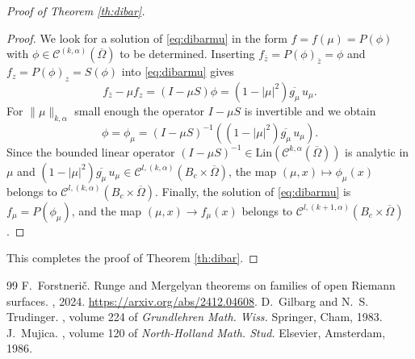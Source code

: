 \documentclass[10pt,a4paper]{amsart}
\newcommand\Cscr{\mathscr{C}}
\begin{document}
\begin{proof}[Proof of Theorem \ref{th:dibar}]
\begin{proof}
We look for a solution of \eqref{eq:dibarmu} in the form $f=f(\mu)=P(\phi)$ with 
$\phi\in \Cscr^{(k,\alpha)}(\overline\Omega)$ to be determined. 
Inserting $f_{\bar z}=P(\phi)_{\bar z}=\phi$ and $f_{z}=P(\phi)_z=S(\phi)$
into \eqref{eq:dibarmu} gives
\[
	f_{\bar z}-\mu f_z = (I-\mu S)\phi = 
	(1-|\mu|^2) \overline{g_\mu} \, u_\mu.
\]
For $\|\mu\|_{k,\alpha}$ small enough the operator $I-\mu S$ is
invertible and we obtain 
\[
	\phi=\phi_\mu = 
	(I-\mu S)^{-1}\left((1-|\mu|^2) \overline{g_\mu} \, u_\mu \right).
\] 
Since the bounded linear operator 
$(I-\mu S)^{-1}\in \mathrm{Lin}(\Cscr^{k,\alpha}(\overline \Omega))$
is analytic in $\mu$ and $(1-|\mu|^2) \overline{g_\mu} \, u_\mu 
\in \Cscr^{l,(k,\alpha)}(B_c\times\overline \Omega)$, the map
$(\mu,x)\mapsto \phi_\mu(x)$ belongs to
$\Cscr^{l,(k,\alpha)}(B_c\times\overline \Omega)$.
Finally, the solution of \eqref{eq:dibarmu} is $f_\mu = P(\phi_\mu)$,  
and the map $(\mu,x)\to f_\mu(x)$ belongs to
$\Cscr^{l,(k+1,\alpha)}(B_c\times \overline \Omega)$. 
\end{proof}

This completes the proof of Theorem \ref{th:dibar}. 
\end{proof}

\begin{thebibliography}{99}
 F.~Forstneri\v{c}. \newblock Runge and {M}ergelyan theorems on families of open {R}iemann surfaces. , 2024. \newblock \url{https://arxiv.org/abs/2412.04608}.
 D.~Gilbarg and N.~S. Trudinger. , volume 224 of {\em Grundlehren Math. Wiss.} \newblock Springer, Cham, 1983.
 J.~Mujica. , volume 120 of {\em North-Holland Math. Stud.} \newblock Elsevier, Amsterdam, 1986.
\end{thebibliography}
\end{document}
